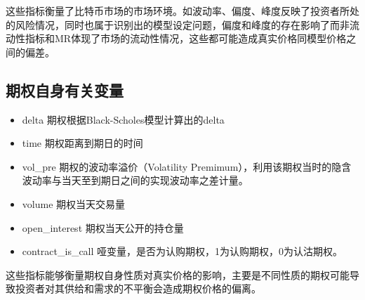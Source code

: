     这些指标衡量了比特币市场的市场环境。如波动率、偏度、峰度反映了投资者所处的风险情况，同时也属于识别出的模型设定问题，偏度和峰度的存在影响了而非流动性指标和MR体现了市场的流动性情况，这些都可能造成真实价格同模型价格之间的偏差。
    \subsection{期权自身有关变量}
    \begin{itemize}
        \item delta 期权根据Black-Scholes模型计算出的delta
        \item time 期权距离到期日的时间
        \item vol\_pre 期权的波动率溢价（Volatility Premimum），利用该期权当时的隐含波动率与当天至到期日之间的实现波动率之差计量。
        \item volume 期权当天交易量                                     
        
        \item open\_interest 期权当天公开的持仓量
        \item contract\_is\_call 哑变量，是否为认购期权，1为认购期权，0为认沽期权。 
    \end{itemize}
    这些指标能够衡量期权自身性质对真实价格的影响，主要是不同性质的期权可能导致投资者对其供给和需求的不平衡会造成期权价格的偏离。
